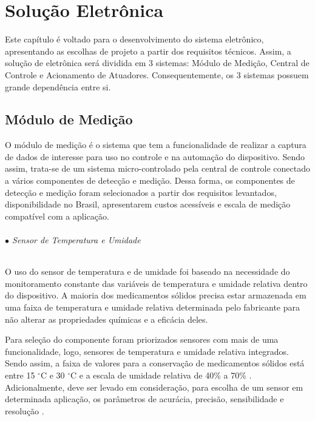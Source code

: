 \chapter[Solução Eletrônica]{Solução Eletrônica}

Este capítulo é voltado para o desenvolvimento do sistema eletrônico, apresentando as escolhas de projeto a partir dos requisitos técnicos. Assim, a solução de eletrônica será dividida em 3 sistemas: Módulo de Medição, Central de Controle e Acionamento de Atuadores. Consequentemente, os 3 sistemas possuem grande dependência entre si.

\section{Módulo de Medição}

O módulo de medição é o sistema que tem a  funcionalidade de realizar a captura de dados de interesse para uso no controle e na automação do dispositivo. Sendo assim, trata-se de um sistema micro-controlado pela central de controle conectado a vários componentes de detecção e medição. Dessa forma, os componentes de detecção e medição foram selecionados a partir dos requisitos levantados, disponibilidade no Brasil, apresentarem custos acessíveis e escala de medição compatível com a aplicação.

    \subparagraph*{$\bullet$ Sensor de Temperatura e Umidade} \hfill
    
    O uso do sensor de temperatura e de umidade foi baseado na necessidade do monitoramento constante das variáveis de temperatura e umidade relativa dentro do dispositivo. A maioria dos medicamentos sólidos precisa estar armazenada em uma faixa de temperatura e umidade relativa determinada pelo fabricante para não alterar as propriedades químicas e a eficácia deles. 
    
    Para seleção do componente foram priorizados sensores com mais de uma funcionalidade, logo, sensores de temperatura e umidade relativa integrados. Sendo assim, a faixa de valores para a conservação de medicamentos sólidos está entre 15 $^\circ$C e 30 $^\circ$C e a escala de umidade relativa de 40\% a 70\% \cite{Pinto_2016}. Adicionalmente, deve ser levado em consideração, para escolha de um sensor em determinada aplicação, os parâmetros de acurácia, precisão, sensibilidade e resolução \cite{webster2018measurement}. 
    
